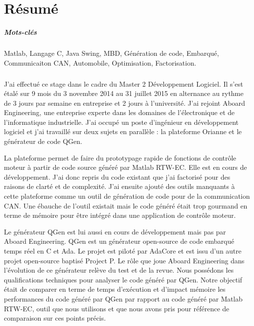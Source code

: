 \chapter*{Résumé}

\paragraph*{Mots-clés}
Matlab, Langage C, Java Swing, MBD, Génération de code, Embarqué, Communicaiton
CAN, Automobile, Optimisation, Factorisation.

\paragraph*{}
J'ai effectué ce stage dans le cadre du Master 2 Développement Logiciel. Il
s'est étalé sur 9 mois du 3 novembre 2014 au 31 juillet 2015 en alternance au
rythme de 3 jours par semaine en entreprise et 2 jours à l'université. J'ai
rejoint Aboard Engineering, une entreprise experte dans les domaines de
l'électronique et de l'informatique industrielle. J'ai occupé un poste
d'ingénieur en développement logiciel et j'ai travaillé sur deux sujets en
parallèle : la plateforme Orianne et le générateur de code QGen.

La plateforme permet de faire du prototypage rapide de fonctions de contrôle
moteur à partir de code source généré par Matlab\up{\circledR}
RTW-EC\up{\circledR}. Elle est en cours de développement. J'ai donc repris du
code existant que j'ai factorisé pour des raisons de clarté et de complexité.
J'ai ensuite ajouté des outils manquants à cette plateforme comme un outil de
génération de code pour de la communication CAN. Une ébauche de l'outil existait
mais le code généré était trop gourmand en terme de mémoire pour être intégré
dans une application de contrôle moteur.

Le générateur QGen est lui aussi en cours de développement mais pas par Aboard
Engineering. QGen est un générateur open-source de code embarqué temps réel en C
et Ada. Le projet est piloté par AdaCore et est issu d'un autre projet
open-source baptisé Project P. Le rôle que joue Aboard Engineering dans
l'évolution de ce générateur relève du test et de la revue. Nous possédons les
qualifications techniques pour analyser le code généré par QGen. Notre objectif
était de comparer en terme de temps d'exécution et d'impact mémoire les
performances du code généré par QGen par rapport au code généré par
Matlab\up{\circledR} RTW-EC\up{\circledR}, outil que nous utilisons et que nous
avons pris pour référence de comparaison sur ces points précis.

